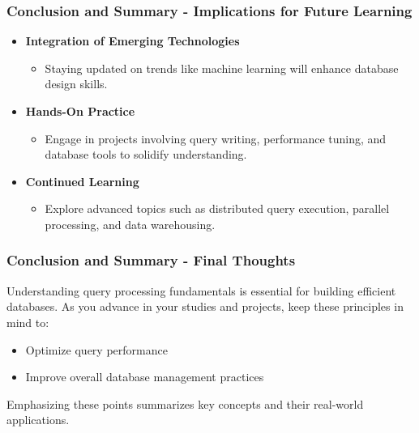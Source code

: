 \documentclass[aspectratio=169]{beamer}
\begin{document}
\begin{frame}[fragile]
    \frametitle{Conclusion and Summary - Implications for Future Learning}
    
    \begin{itemize}
        \item \textbf{Integration of Emerging Technologies}
        \begin{itemize}
            \item Staying updated on trends like machine learning will enhance database design skills.
        \end{itemize}
        
        \item \textbf{Hands-On Practice}
        \begin{itemize}
            \item Engage in projects involving query writing, performance tuning, and database tools to solidify understanding.
        \end{itemize}

        \item \textbf{Continued Learning}
        \begin{itemize}
            \item Explore advanced topics such as distributed query execution, parallel processing, and data warehousing.
        \end{itemize}
    \end{itemize}
\end{frame}

\begin{frame}[fragile]
    \frametitle{Conclusion and Summary - Final Thoughts}
    
    Understanding query processing fundamentals is essential for building efficient databases. 
    As you advance in your studies and projects, keep these principles in mind to:
    
    \begin{itemize}
        \item Optimize query performance
        \item Improve overall database management practices
    \end{itemize}
    
    Emphasizing these points summarizes key concepts and their real-world applications.
\end{frame}
\end{document}
